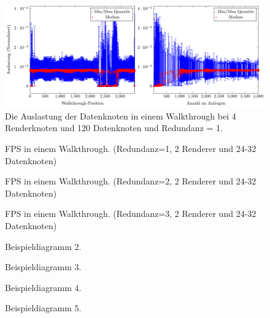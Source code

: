 \begin{figure}
\centering
\includegraphics[scale=0.75]{images/diag_cCol_red1_render4_data120_2x.pdf}
\caption{\label{fig:eval:cCol1}Die Auslastung der Datenknoten in einem Walkthrough bei 4 Renderknoten und 120 Datenknoten und Redundanz = 1.}
\end{figure}

\begin{figure}
\centering

  \caption{FPS in einem Walkthrough. (Redundanz=1, 2 Renderer und 24-32 Datenknoten)}
  \label{fig:eval:diag1}
\end{figure}

\begin{figure}
\centering

  \caption{FPS in einem Walkthrough. (Redundanz=2, 2 Renderer und 24-32 Datenknoten)}
  \label{fig:eval:diag1}
\end{figure}

\begin{figure}
\centering

  \caption{FPS in einem Walkthrough. (Redundanz=3, 2 Renderer und 24-32 Datenknoten)}
  \label{fig:eval:diag1}
\end{figure}

\begin{figure}
\centering

  \caption{Beispieldiagramm 2.}
  \label{fig:eval:diag2}
\end{figure}

\begin{figure}
\centering

  \caption{Beispieldiagramm 3.}
  \label{fig:eval:diag3}
\end{figure}

\begin{figure}
\centering

  \caption{Beispieldiagramm 4.}
  \label{fig:eval:diag4}
\end{figure}

\begin{figure}
  \centering
  
  \caption{Beispieldiagramm 5. }
  \label{fig:eval:diag5}
\end{figure}
